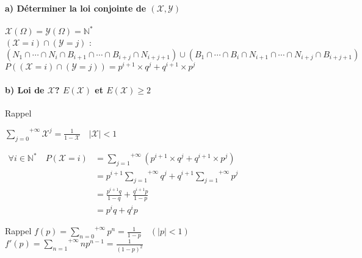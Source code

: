 \documentclass[a4paper, 12pt]{article}
\begin{document}
\paragraph{a) Déterminer la loi conjointe de $(\mathcal{X, Y})$ \\}
\begin{flushleft}
$\mathcal{X} (\Omega) = \mathcal{Y} (\Omega) = \mathbb{N}^*$ \\
$(\mathcal{X} = i) \cap (\mathcal{Y} = j)$ : \\
$(N_1 \cap \cdots \cap N_i \cap B_{i + 1} \cap \cdots \cap B_{i + j} \cap N_{i + j + 1}) \cup (B_1 \cap \cdots \cap B_i \cap N_ {i + 1} \cap \cdots \cap N_{i + j} \cap B_{i + j + 1})$ \\
$\boxed{P ((\mathcal{X} = i) \cap (\mathcal{Y} = j)) = p^{i + 1} \times q^j + q^{i + 1} \times p^j}$
\end{flushleft}


\paragraph{b) Loi de $\mathcal{X}$? $E(\mathcal{X})$ et $E(\mathcal{X}) \geq 2$ \\}
\begin{flushleft}
\begin{rappel}{Rappel}
{
\Large
\begin{center}
$\overset{+\infty}{\underset{j = 0}{\sum}} \mathcal{X}^j = \frac{1}{1 - \mathcal{X}} \quad |\mathcal{X}| < 1$
\end{center}
}
\end{rappel}
\end{flushleft}

$
\begin{aligned}
\forall i \in \mathbb{N}^* \quad P (\mathcal{X} = i) &= \overset{+\infty}{\underset{j = 1}{\sum}} (p^{i + 1} \times q^j + q^{i + 1} \times p^j) \\
&= p^{i + 1} \overset{+\infty}{\underset{j = 1}{\sum}} q^j + q^{i + 1} \overset{+\infty}{\underset{j = 1}{\sum}} p^j \\
&= \frac{p^{i + 1} q}{1 - q} + \frac{q^{i + 1} p}{1 - p} \\
&\boxed{= p^iq + q^ip}
\end{aligned}
$

\begin{rappel}{Rappel}
$f(p) = \overset{+\infty}{\underset{n = 0}{\sum}} p^n = \frac{1}{1 - p} \quad (|p| < 1)$ \\
$f'(p) = \overset{+\infty}{\underset{n = 1}{\sum}} np^{n - 1} = \frac{1}{(1 - p)^2}$
\end{rappel}
\end{document}
